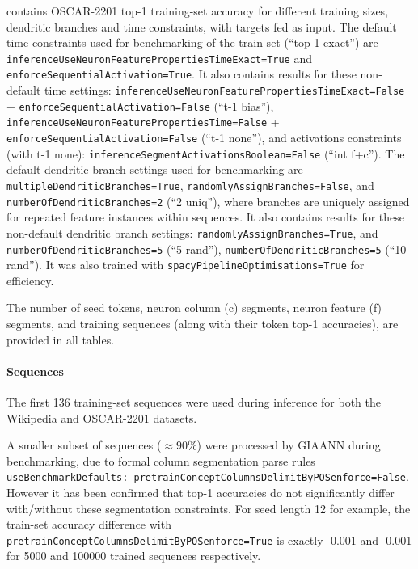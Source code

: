 contains OSCAR-2201 top-1 training-set accuracy for different training sizes, dendritic branches and time constraints, with targets fed as input. The default time constraints used for benchmarking of the train-set (``top-1 exact'') are \texttt{inferenceUseNeuronFeaturePropertiesTimeExact=True} and \texttt{enforceSequentialActivation=True}. It also contains results for these non-default time settings: \texttt{inferenceUseNeuronFeaturePropertiesTimeExact=False} + \texttt{enforceSequentialActivation=False} (``t-1 bias''), \texttt{inferenceUseNeuronFeaturePropertiesTime=False} + \texttt{enforceSequentialActivation=False} (``t-1 none''), and activations constraints (with t-1 none): \texttt{inferenceSegmentActivationsBoolean=False} (``int f+c''). The default dendritic branch settings used for benchmarking are \texttt{multipleDendriticBranches=True}, \texttt{randomlyAssignBranches=False}, and \texttt{numberOfDendriticBranches=2} (``2 uniq''), where branches are uniquely assigned for repeated feature instances within sequences. It also contains results for these non-default dendritic branch settings: \texttt{randomlyAssignBranches=True}, and \texttt{numberOfDendriticBranches=5} (``5 rand''), \texttt{numberOfDendriticBranches=5} (``10 rand''). It was also trained with \texttt{spacyPipelineOptimisations=True} for efficiency.

The number of seed tokens, neuron column (c) segments, neuron feature (f) segments, and training sequences (along with their token top-1 accuracies), are provided in all tables.

\paragraph{Sequences}

The first 136 training-set sequences were used during inference for both the Wikipedia and OSCAR-2201 datasets.

A smaller subset of sequences ($\approx 90\%$) were processed by GIAANN during benchmarking, due to formal column segmentation parse rules \texttt{useBenchmarkDefaults: pretrainConceptColumnsDelimitByPOSenforce=False}. However it has been confirmed that top-1 accuracies do not significantly differ with/without these segmentation constraints. For seed length 12 for example, the train-set accuracy difference with \texttt{pretrainConceptColumnsDelimitByPOSenforce=True} is exactly -0.001 and -0.001 for 5000 and 100000 trained sequences respectively.

